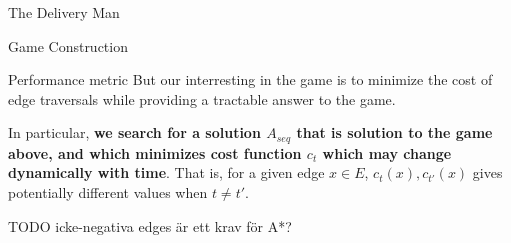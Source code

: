 \begin{section}{The Delivery Man}
\begin{subsection}{Game Construction}
\begin{subsubsection}{Performance metric}
      But our interresting in the game is to minimize the cost of edge traversals while providing a tractable answer to the game.

      In particular, \textbf{we search for a solution $A_{seq}$ that is solution to the game above, and which minimizes cost function $c_t$ which may change dynamically with time}. That is, for a given edge $x\in E$, $c_t(x), c_{t'}(x)$ gives potentially different values when $t \neq t'$.
    \end{subsubsection}

    TODO icke-negativa edges är ett krav för A*?
  \end{subsection}

  

\end{section}
